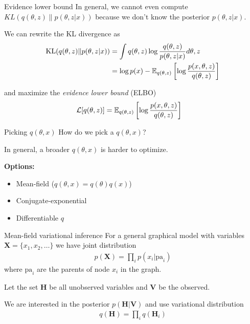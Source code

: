 \documentclass[10pt, compress]{beamer}
\begin{document}
\begin{frame}{Evidence lower bound}
  In general, we cannot even compute $KL(q(\theta, z)\|p(\theta, z | x))$
  because
  we don't know the posterior $p(\theta, z | x)$.

  \pause
  We can rewrite the KL divergence as
  \begin{align*}
    \textrm{KL}(q(\theta, z)\|p(\theta, z|x)) &= \int q(\theta, z)\log\frac{q(\theta, z)}{p(\theta, z | x)}d\theta, z \\
              &= \log p(x) - \mathbb{E}_{q(\theta, z)}\left[\log\frac{p(x, \theta, z)}{q(\theta, z)}\right]
  \end{align*}

  \pause
  and maximize the \emph{evidence lower bound} (ELBO)
  \begin{align*}
    \mathcal{L}[q(\theta, z)] &= \mathbb{E}_{q(\theta, z)}\left[\log\frac{p(x, \theta, z)}{q(\theta, z)}\right]
  \end{align*}
\end{frame}

\begin{frame}{Picking $q(\theta, x)$}
  How do we pick a $q(\theta, x)$?

  \pause

  In general, a broader $q(\theta, x)$ is harder to optimize.

  \textbf{Options:}
  \begin{itemize}
      \pause
    \item Mean-field ($q(\theta, x) = q(\theta)q(x)$)
      \pause
    \item Conjugate-exponential
      \pause
    \item Differentiable $q$
  \end{itemize}
\end{frame}

\begin{frame}{Mean-field variational inference}
  For a general graphical model
  with variables $\mathbf{X} = \{x_1, x_2, \ldots\}$
  we have joint distribution
  \begin{align*}
    p(\mathbf{X}) = \prod_i p(x_i | \textrm{pa}_i)
  \end{align*}
  where $\textrm{pa}_i$ are the parents of node $x_i$
  in the graph.


  \pause
  Let the set $\mathbf{H}$ be
  all unobserved variables and $\mathbf{V}$ be the observed.


  \pause
  We are interested in the posterior $p(\mathbf{H} | \mathbf{V})$
  and use variational distribution 
  \begin{align*}
    q(\mathbf{H}) = \prod_i q(\mathbf{H}_i)
  \end{align*}


\end{frame}
\end{document}
